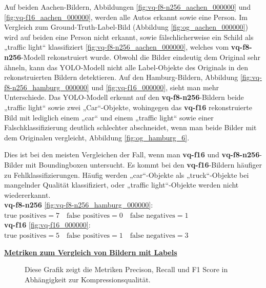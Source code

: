 \newpage
            Auf beiden Aachen-Bildern, Abbildungen \ref{fig:vq-f8-n256_aachen_000000} und \ref{fig:vq-f16_aachen_000000}, werden alle Autos erkannt sowie eine Person. Im Vergleich zum Ground-Truth-Label-Bild
            (Abbildung \ref{fig:og_aachen_000000}) wird auf beiden eine Person nicht erkannt, sowie fälschlicherweise ein Schild als „traffic light“ klassifiziert \ref{fig:vq-f8-n256_aachen_000000}, welches vom
            \textbf{vq-f8-n256}-Modell rekonstruiert wurde.
            Obwohl die Bilder eindeutig dem Original sehr ähneln, kann das YOLO-Modell nicht alle Label-Objekte des Originals in den rekonstruierten Bildern detektieren.
            Auf den Hamburg-Bildern, Abbildung \ref{fig:vq-f8-n256_hamburg_000000} und \ref{fig:vq-f16_000000},
            sieht man mehr Unterschiede. Das YOLO-Modell erkennt auf den \textbf{vq-f8-n256}-Bildern beide
            „traffic light“ sowie zwei „Car“-Objekte, wohingegen das \textbf{vq-f16} rekonstruierte Bild mit lediglich einem  
            „car“ und einem „traffic light“ sowie einer Falschklassifizierung deutlich schlechter abschneidet, wenn man beide Bilder mit dem Originalen vergleicht, Abbildung \ref{fig:og_hamburg_6}.
            
            Dies ist bei den meisten Vergleichen der Fall, wenn man \textbf{vq-f16} und \textbf{vq-f8-n256}-Bilder mit Boundingboxen untersucht. Es kommt bei den \textbf{vq-f16}-Bildern häufiger zu Fehlklassifizierungen. Häufig werden „car“-Objekte als „truck“-Objekte bei mangelnder Qualität klassifiziert, oder „traffic light“-Objekte werden nicht wiedererkannt.\\
            \textbf{vq-f8-n256} \ref{fig:vq-f8-n256_hamburg_000000}:\\
            $\text{true positives} = 7 \quad \text{false positives} = 0 \quad \text{false negatives} = 1$\\
            \textbf{vq-f16} \ref{fig:vq-f16_000000}:\\
            $\text{true positives} = 5 \quad \text{false positives} = 1 \quad \text{false negatives} = 3$
            
            
            
\newpage  
            \underline{\textbf{Metriken zum Vergleich von Bildern mit Labels}}  

            \begin{figure}[!htb]
                \centering
                
                \caption{Diese Grafik zeigt die Metriken Precison, Recall und F1 Score in Abhängigkeit zur Kompressionsqualität.}
                \label{fig:pr_f1_re_model}
            \end{figure}

